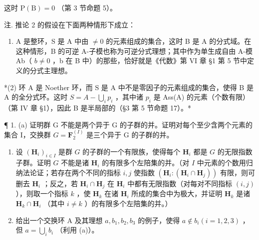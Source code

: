 这时 \(\mathrm{P(B)} = 0\) （第 3 节命题 5）。

注. 推论 2 的假设在下面两种情形下成立：

\begin{enumerate}
\def\labelenumi{(\arabic{enumi})}
\tightlist
\item
  A 是整环，S 是 A 中由 \(\neq0\) 的元素组成的集合，这时 B 是 A 的分式域。在这种情形，B 的可逆 A-子模也称为可逆分式理想；其中作为单生成自由 A-模 Ab（ \(b\neq0\) ，b 在 B 中）的那些，恰好就是《代数》第 VI 章 §1 第 5 节中定义的分式主理想。
\end{enumerate}

*(2) 环 A 是 Noether 环，而 S 是 A 中不是零因子的元素组成的集合，使得 B 是 A 的全分式环。这时 \(S = A - \bigcup_{i} p_i\) ，其中诸 \(p_i\) 是 Ass(A) 的元素（个数有限）（第 IV 章 §1），因此 B 是半局部的（§3 第 5 节命题 17）。*



¶ 1. (a) 证明群 G 不能是两个异于 G 的子群的并。证明对每个至少含两个元素的集合 I，交换群 \(G = \mathbf{F}_{2}^{(I)}\) 是三个异于 G 的子群的并。

\begin{enumerate}
\def\labelenumi{(\alph{enumi})}
\setcounter{enumi}{1}
\item
  设 \((\mathbf{H}_i)_{i\in I}\) 是群 \(G\) 的子群的一个有限族，使得每个 \(\mathbf{H}_i\) 都是 \(G\) 的无限指数子群。证明 \(G\) 不能是诸 \(\mathbf{H}_i\) 的有限多个左陪集的并。（对 \(I\) 中元素的个数用归纳法论证；若存在两个不同的指标 \(i,j\) 使指数 \((\mathbf{H}_i:(\mathbf{H}_i\cap \mathbf{H}_j))\) 有限，则可删去 \(\mathbf{H}_i\) ；反之，若 \(\mathbf{H}_i\cap \mathbf{H}_j\) 在 \(\mathbf{H}_i\) 中都有无限指数（对每对不同指标 \((i,j)\) ），则取一个指标 \(k\) ，使 \(\mathbf{H}_k\) 在诸 \(\mathbf{H}_i\) 所成的集合中为极大，并证明 \(\mathbf{H}_k\) 是诸 \(\mathbf{H}_k\cap \mathbf{H}_i\) （其中 \(i\neq k\) ）的有限多个左陪集的并。）
\item
  给出一个交换环 A 及其理想 \(a, b_{1}, b_{2}, b_{3}\) 的例子，使得 \(a \notin b_{i} (i = 1, 2, 3)\) ，但 \(a = \bigcup_{i} b_{i}\) （利用 (a)）。
\end{enumerate}

